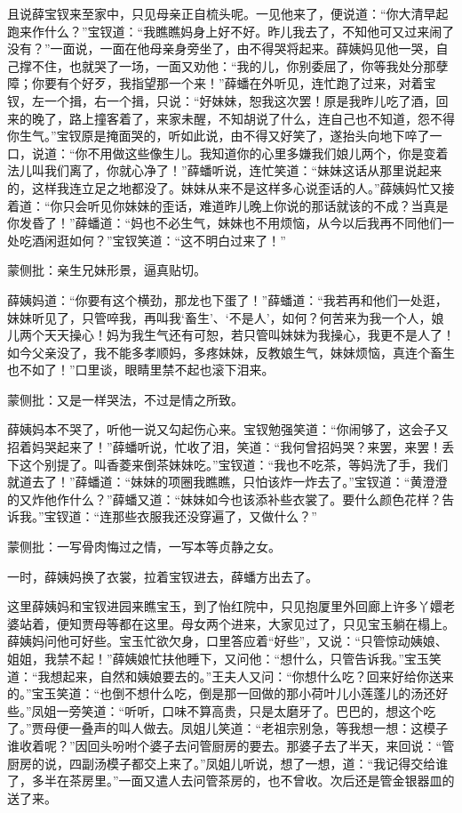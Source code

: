 \begin{parag}


    且说薛宝钗来至家中，只见母亲正自梳头呢。一见他来了，便说道：“你大清早起跑来作什么？”宝钗道：“我瞧瞧妈身上好不好。昨儿我去了，不知他可又过来闹了没有？”一面说，一面在他母亲身旁坐了，由不得哭将起来。薛姨妈见他一哭，自己撑不住，也就哭了一场，一面又劝他：“我的儿，你别委屈了，你等我处分那孽障；你要有个好歹，我指望那一个来！”薛蟠在外听见，连忙跑了过来，对着宝钗，左一个揖，右一个揖，只说：“好妹妹，恕我这次罢！原是我昨儿吃了酒，回来的晚了，路上撞客着了，来家未醒，不知胡说了什么，连自己也不知道，怨不得你生气。”宝钗原是掩面哭的，听如此说，由不得又好笑了，遂抬头向地下啐了一口，说道：“你不用做这些像生儿。我知道你的心里多嫌我们娘儿两个，你是变着法儿叫我们离了，你就心净了！”薛蟠听说，连忙笑道：“妹妹这话从那里说起来的，这样我连立足之地都没了。妹妹从来不是这样多心说歪话的人。”薛姨妈忙又接着道：“你只会听见你妹妹的歪话，难道昨儿晚上你说的那话就该的不成？当真是你发昏了！”薛蟠道：“妈也不必生气，妹妹也不用烦恼，从今以后我再不同他们一处吃酒闲逛如何？”宝钗笑道：“这不明白过来了！”\begin{note}蒙侧批：亲生兄妹形景，逼真贴切。\end{note}薛姨妈道：“你要有这个横劲，那龙也下蛋了！”薛蟠道：“我若再和他们一处逛，妹妹听见了，只管啐我，再叫我‘畜生’、‘不是人’，如何？何苦来为我一个人，娘儿两个天天操心！妈为我生气还有可恕，若只管叫妹妹为我操心，我更不是人了！如今父亲没了，我不能多孝顺妈，多疼妹妹，反教娘生气，妹妹烦恼，真连个畜生也不如了！”口里谈，眼睛里禁不起也滚下泪来。\begin{note}蒙侧批：又是一样哭法，不过是情之所致。\end{note}薛姨妈本不哭了，听他一说又勾起伤心来。宝钗勉强笑道：“你闹够了，这会子又招着妈哭起来了！”薛蟠听说，忙收了泪，笑道：“我何曾招妈哭？来罢，来罢！丢下这个别提了。叫香菱来倒茶妹妹吃。”宝钗道：“我也不吃茶，等妈洗了手，我们就道去了！”薛蟠道：“妹妹的项圈我瞧瞧，只怕该炸一炸去了。”宝钗道：“黄澄澄的又炸他作什么？”薛蟠又道：“妹妹如今也该添补些衣裳了。要什么颜色花样？告诉我。”宝钗道：“连那些衣服我还没穿遍了，又做什么？”\begin{note}蒙侧批：一写骨肉悔过之情，一写本等贞静之女。\end{note}一时，薛姨妈换了衣裳，拉着宝钗进去，薛蟠方出去了。
\end{parag}


\begin{parag}


    这里薛姨妈和宝钗进园来瞧宝玉，到了怡红院中，只见抱厦里外回廊上许多丫嬛老婆站着，便知贾母等都在这里。母女两个进来，大家见过了，只见宝玉躺在榻上。薛姨妈问他可好些。宝玉忙欲欠身，口里答应着“好些”，又说：“只管惊动姨娘、姐姐，我禁不起！”薛姨娘忙扶他睡下，又问他：“想什么，只管告诉我。”宝玉笑道：“我想起来，自然和姨娘要去的。”王夫人又问：“你想什么吃？回来好给你送来的。”宝玉笑道：“也倒不想什么吃，倒是那一回做的那小荷叶儿小莲蓬儿的汤还好些。”凤姐一旁笑道：“听听，口味不算高贵，只是太磨牙了。巴巴的，想这个吃了。”贾母便一叠声的叫人做去。凤姐儿笑道：“老祖宗别急，等我想一想：这模子谁收着呢？”因回头吩咐个婆子去问管厨房的要去。那婆子去了半天，来回说：“管厨房的说，四副汤模子都交上来了。”凤姐儿听说，想了一想，道：“我记得交给谁了，多半在茶房里。”一面又遣人去问管茶房的，也不曾收。次后还是管金银器皿的送了来。
\end{parag}


